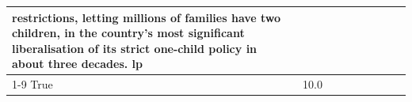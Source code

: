 \begin{table}[H]
\begin{tabular}{lllrlllll}
restrictions, letting millions of families have two children, in the country's most significant liberalisation of its strict one-child policy in about three decades. lp \\
\cline{1-9}
True & 10.0%
\end{tabular}
\end{table}
